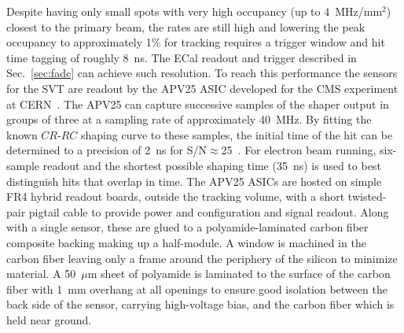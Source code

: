 \documentclass[final,3p,times,twocolumn]{elsarticle}
\begin{document}
Despite having only small spots with very high occupancy (up to 4~MHz/mm$^2$) closest to the primary 
beam, the rates are still high and lowering the peak occupancy to 
approximately 1\% for tracking requires a trigger window and hit time tagging of roughly 8~ns. The 
ECal readout and trigger described in Sec.~\ref{sec:fadc} can achieve such resolution. To reach this 
performance the sensors for the SVT are readout by the APV25 ASIC developed for the CMS 
experiment at CERN~\cite{French:2001xb}. The APV25 can capture successive samples of the shaper output 
in groups of three at a sampling rate of approximately 40~MHz.  By fitting the known 
$CR$-$RC$ shaping curve to these samples, the initial time of the hit can be determined to a precision 
of 2~ns for S/N$\approx$25~\cite{Friedl:2009zz}.  For electron beam running, six-sample readout and 
the shortest possible shaping time (35~ns) is used to best distinguish hits that overlap in time.
The APV25 ASICs are hosted on simple FR4 hybrid readout boards, outside the tracking volume, with a 
short twisted-pair pigtail cable to provide power and configuration and signal readout. Along with a 
single sensor, these are glued to a polyamide-laminated carbon fiber composite backing making 
up a half-module. A window is machined in the carbon fiber leaving only a frame around the periphery 
of the silicon to minimize material. A 50~$\mu$m sheet of polyamide is laminated to the surface of the 
carbon fiber with 1~mm overhang at all openings to ensure good isolation between the back side of the 
sensor, carrying high-voltage bias, and the carbon fiber which is held near ground. 
\end{document}
